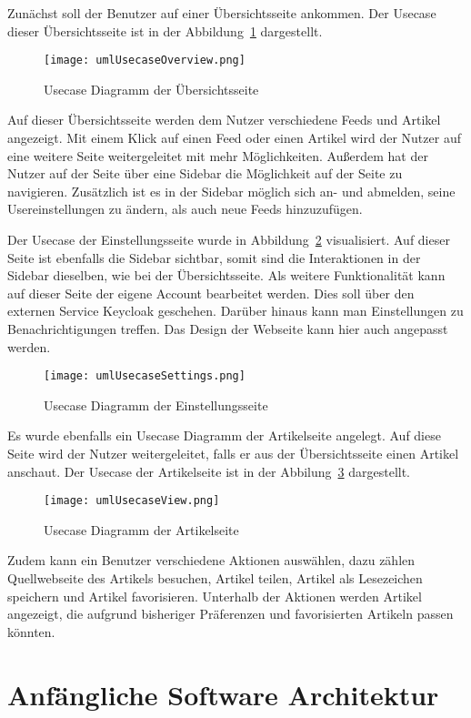 Zunächst soll der Benutzer auf einer Übersichtsseite ankommen.
Der Usecase dieser Übersichtsseite ist in der Abbildung~\ref{fig:usecaseOverview} dargestellt.
\begin{figure}
    \texttt{[image: umlUsecaseOverview.png]}
    \caption{Usecase Diagramm der Übersichtsseite}
    \label{fig:usecaseOverview}
\end{figure}
Auf dieser Übersichtsseite werden dem Nutzer verschiedene Feeds und Artikel angezeigt. Mit einem Klick auf einen Feed oder einen Artikel wird
der Nutzer auf eine weitere Seite weitergeleitet mit mehr Möglichkeiten. Außerdem hat der Nutzer auf der Seite über eine Sidebar die Möglichkeit
auf der Seite zu navigieren. Zusätzlich ist es in der Sidebar möglich  sich an- und abmelden, seine Usereinstellungen zu ändern, als auch neue Feeds
hinzuzufügen. 

Der Usecase der Einstellungsseite wurde in Abbildung~\ref{fig:usecaseSettings} visualisiert.
Auf dieser Seite ist ebenfalls die Sidebar sichtbar, somit sind die Interaktionen in der Sidebar dieselben, wie
bei der Übersichtsseite. Als weitere Funktionalität kann auf dieser Seite der eigene Account bearbeitet werden.
Dies soll über den externen Service Keycloak geschehen. Darüber hinaus
kann man Einstellungen zu Benachrichtigungen treffen. Das Design der
Webseite kann hier auch angepasst werden.
\begin{figure}
    \texttt{[image: umlUsecaseSettings.png]}
    \caption{Usecase Diagramm der Einstellungsseite}
    \label{fig:usecaseSettings}
\end{figure}


Es wurde ebenfalls ein Usecase Diagramm der Artikelseite angelegt. Auf diese Seite
wird der Nutzer weitergeleitet, falls er aus der Übersichtsseite einen Artikel anschaut.
Der Usecase der Artikelseite ist in der Abbilung~\ref{fig:usecaseView} dargestellt.
\begin{figure}
    \texttt{[image: umlUsecaseView.png]}
    \caption{Usecase Diagramm der Artikelseite}
    \label{fig:usecaseView}
\end{figure}
Zudem kann ein Benutzer verschiedene Aktionen auswählen, dazu zählen Quellwebseite des Artikels besuchen, Artikel teilen, Artikel als 
Lesezeichen speichern und Artikel favorisieren. Unterhalb der Aktionen werden Artikel angezeigt, die aufgrund bisheriger Präferenzen und 
favorisierten Artikeln passen könnten.

\section{Anfängliche Software Architektur}
